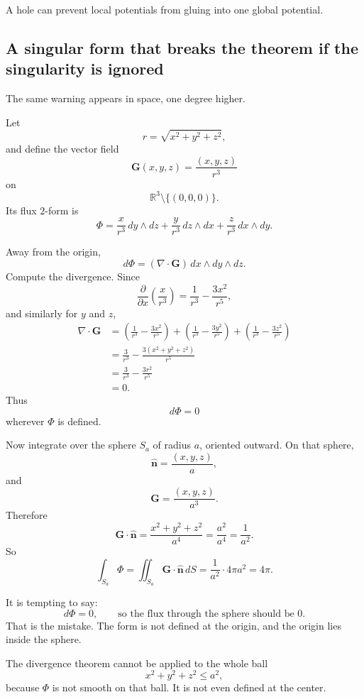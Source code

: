 A hole can prevent local potentials from gluing into one global potential.

\subsection{A singular form that breaks the theorem if the singularity is ignored}

The same warning appears in space, one degree higher.

Let
\[
    r=\sqrt{x^2+y^2+z^2},
\]
and define the vector field
\[
    \mathbf G(x,y,z)=\frac{(x,y,z)}{r^3}
\]
on
\[
    \mathbb R^3\setminus\{(0,0,0)\}.
\]
Its flux \(2\)-form is
\[
\boxed{
    \Phi=
    \frac{x}{r^3}\,dy\wedge dz+
    \frac{y}{r^3}\,dz\wedge dx+
    \frac{z}{r^3}\,dx\wedge dy.
}
\]

Away from the origin,
\[
    d\Phi=(\nabla\cdot\mathbf G)\,dx\wedge dy\wedge dz.
\]
Compute the divergence.  Since
\[
    \frac{\partial}{\partial x}\left(\frac{x}{r^3}\right)
    =
    \frac1{r^3}-\frac{3x^2}{r^5},
\]
and similarly for \(y\) and \(z\),
\[
\begin{aligned}
\nabla\cdot\mathbf G
&=
\left(\frac1{r^3}-\frac{3x^2}{r^5}\right)
+
\left(\frac1{r^3}-\frac{3y^2}{r^5}\right)
+
\left(\frac1{r^3}-\frac{3z^2}{r^5}\right)\\
&=
\frac3{r^3}-\frac{3(x^2+y^2+z^2)}{r^5}\\
&=
\frac3{r^3}-\frac{3r^2}{r^5}\\
&=
0.
\end{aligned}
\]
Thus
\[
\boxed{
    d\Phi=0
}
\]
wherever \(\Phi\) is defined.

Now integrate over the sphere \(S_a\) of radius \(a\), oriented outward.  On that
sphere,
\[
    \widehat{\mathbf n}=\frac{(x,y,z)}{a},
\]
and
\[
    \mathbf G=\frac{(x,y,z)}{a^3}.
\]
Therefore
\[
    \mathbf G\cdot\widehat{\mathbf n}
    =
    \frac{x^2+y^2+z^2}{a^4}
    =
    \frac{a^2}{a^4}
    =
    \frac1{a^2}.
\]
So
\[
\boxed{
    \int_{S_a}\Phi
    =
    \iint_{S_a}\mathbf G\cdot\widehat{\mathbf n}\,dS
    =
    \frac1{a^2}\cdot 4\pi a^2
    =
    4\pi.
}
\]

It is tempting to say:
\[
    d\Phi=0,
    \qquad
    \text{so the flux through the sphere should be }0.
\]
That is the mistake.  The form is not defined at the origin, and the origin lies inside
the sphere.

The divergence theorem cannot be applied to the whole ball
\[
    x^2+y^2+z^2\le a^2,
\]
because \(\Phi\) is not smooth on that ball.  It is not even defined at the center.

